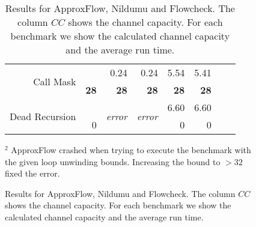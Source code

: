 \begin{figure}
\begin{table}[H]
\begin{tabular}{rr|rr|rr|rr}
\multirow{2}{*}{Call Mask}            &               & 0.24                   & 0.24                   & 5.54          & 5.41         &                &               \\
                                      & \textbf{28}   & \textbf{28}            & \textbf{28}            & \textbf{28}   & \textbf{28}  &                &               \\ \hline
\multirow{2}{*}{Dead Recursion}       &               & \multirow{2}{*}{\textit{error}} & \multirow{2}{*}{\textit{error}} & 6.60          & 6.60         &                &               \\
                                      & 0             &                        &                        & 0             & 0            &                &              
\end{tabular}
\caption{Results for ApproxFlow, Nildumu and Flowcheck. The column $CC$ shows the channel capacity. For each benchmark we show the calculated channel capacity and the average run time.}\label{tab:othertools}
\end{table}
{\footnotesize $^2$ ApproxFlow crashed when trying to execute the benchmark with the given loop unwinding bounds. Increasing the bound to $> 32$ fixed the error.}
\end{figure}

